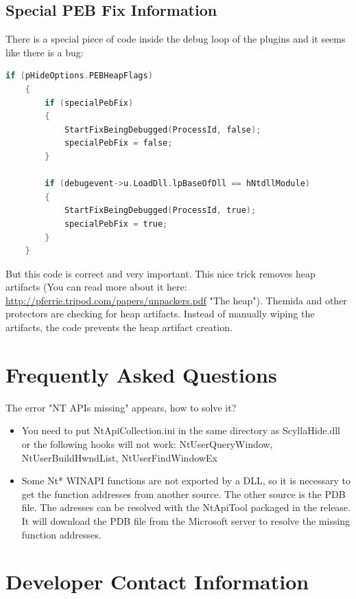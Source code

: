 \documentclass[10pt,a4paper]{article}
\begin{document}
\subsection{Special PEB Fix Information}

There is a special piece of code inside the debug loop of the plugins and it seems like there is a bug:
\begin{lstlisting}[language=C, caption=Special PEB Fix Code]
    if (pHideOptions.PEBHeapFlags)
    {
        if (specialPebFix)
        {
            StartFixBeingDebugged(ProcessId, false);
            specialPebFix = false;
        }

        if (debugevent->u.LoadDll.lpBaseOfDll == hNtdllModule)
        {
            StartFixBeingDebugged(ProcessId, true);
            specialPebFix = true;
        }
    }
\end{lstlisting}
But this code is correct and very important. This nice trick removes heap artifacts (You can read more about it here: \url{http://pferrie.tripod.com/papers/unpackers.pdf} "The heap"). Themida and other protectors are checking for heap artifacts. Instead of manually wiping the artifacts, the code prevents the heap artifact creation.

\section{Frequently Asked Questions}
The error "NT APIs missing" appears, how to solve it?
\begin{itemize}
\item You need to put NtApiCollection.ini in the same directory as ScyllaHide.dll or the following hooks will not work: NtUserQueryWindow, NtUserBuildHwndList, NtUserFindWindowEx
\item Some Nt* WINAPI functions are not exported by a DLL, so it is necessary to get the function addresses from another source. The other source is the PDB file. The adresses can be resolved with the NtApiTool packaged in the release. It will download the PDB file from the Microsoft server to resolve the missing function addresses.
\end{itemize}

\section{Developer Contact Information}
\end{document}
